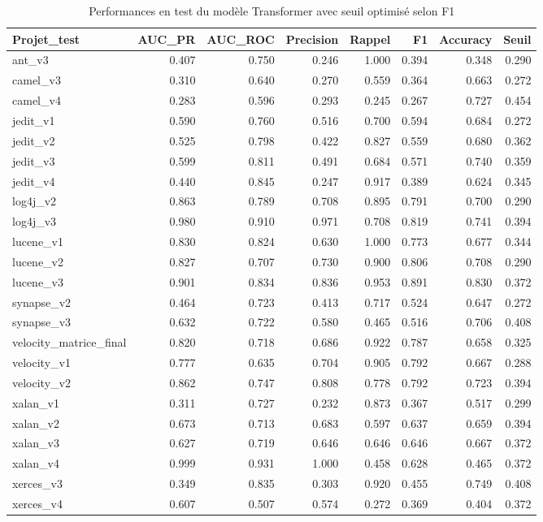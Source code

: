 \begin{table}
\caption{Performances en test du modèle Transformer avec seuil optimisé selon F1}
\label{tab:transformer_f1}
\begin{tabular}{lrrrrrrr}
\toprule
Projet_test & AUC_PR & AUC_ROC & Precision & Rappel & F1 & Accuracy & Seuil \\
\midrule
ant_v3 & 0.407 & 0.750 & 0.246 & 1.000 & 0.394 & 0.348 & 0.290 \\
camel_v3 & 0.310 & 0.640 & 0.270 & 0.559 & 0.364 & 0.663 & 0.272 \\
camel_v4 & 0.283 & 0.596 & 0.293 & 0.245 & 0.267 & 0.727 & 0.454 \\
jedit_v1 & 0.590 & 0.760 & 0.516 & 0.700 & 0.594 & 0.684 & 0.272 \\
jedit_v2 & 0.525 & 0.798 & 0.422 & 0.827 & 0.559 & 0.680 & 0.362 \\
jedit_v3 & 0.599 & 0.811 & 0.491 & 0.684 & 0.571 & 0.740 & 0.359 \\
jedit_v4 & 0.440 & 0.845 & 0.247 & 0.917 & 0.389 & 0.624 & 0.345 \\
log4j_v2 & 0.863 & 0.789 & 0.708 & 0.895 & 0.791 & 0.700 & 0.290 \\
log4j_v3 & 0.980 & 0.910 & 0.971 & 0.708 & 0.819 & 0.741 & 0.394 \\
lucene_v1 & 0.830 & 0.824 & 0.630 & 1.000 & 0.773 & 0.677 & 0.344 \\
lucene_v2 & 0.827 & 0.707 & 0.730 & 0.900 & 0.806 & 0.708 & 0.290 \\
lucene_v3 & 0.901 & 0.834 & 0.836 & 0.953 & 0.891 & 0.830 & 0.372 \\
synapse_v2 & 0.464 & 0.723 & 0.413 & 0.717 & 0.524 & 0.647 & 0.272 \\
synapse_v3 & 0.632 & 0.722 & 0.580 & 0.465 & 0.516 & 0.706 & 0.408 \\
velocity_matrice_final & 0.820 & 0.718 & 0.686 & 0.922 & 0.787 & 0.658 & 0.325 \\
velocity_v1 & 0.777 & 0.635 & 0.704 & 0.905 & 0.792 & 0.667 & 0.288 \\
velocity_v2 & 0.862 & 0.747 & 0.808 & 0.778 & 0.792 & 0.723 & 0.394 \\
xalan_v1 & 0.311 & 0.727 & 0.232 & 0.873 & 0.367 & 0.517 & 0.299 \\
xalan_v2 & 0.673 & 0.713 & 0.683 & 0.597 & 0.637 & 0.659 & 0.394 \\
xalan_v3 & 0.627 & 0.719 & 0.646 & 0.646 & 0.646 & 0.667 & 0.372 \\
xalan_v4 & 0.999 & 0.931 & 1.000 & 0.458 & 0.628 & 0.465 & 0.372 \\
xerces_v3 & 0.349 & 0.835 & 0.303 & 0.920 & 0.455 & 0.749 & 0.408 \\
xerces_v4 & 0.607 & 0.507 & 0.574 & 0.272 & 0.369 & 0.404 & 0.372 \\
\bottomrule
\end{tabular}
\end{table}

